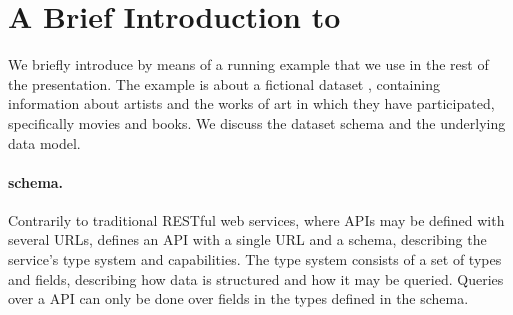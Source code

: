 \section{A Brief Introduction to \gql}\label{sec:bg}


We briefly introduce \gql by means of a running example that we use in
the rest of the presentation.  The example is about a fictional
dataset \goodbois, containing information about artists and the works of art in which they have participated, 
specifically movies and books.
We discuss the dataset schema and the underlying data model.




\paragraph{\gql schema.}

Contrarily to traditional RESTful web services, where APIs may be defined with several URLs, 
\gql defines an API with a single URL and a schema, describing the service's type system and capabilities.
The type system consists of a set of types and fields, describing how data is structured and how it may be queried.
Queries over a \gql API can only be done over fields in the types defined in the schema.

